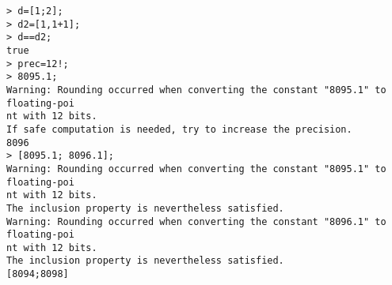 \begin{center}\begin{minipage}{15cm}\begin{Verbatim}[frame=single]
> d=[1;2];
> d2=[1,1+1];
> d==d2;
true
> prec=12!;
> 8095.1;
Warning: Rounding occurred when converting the constant "8095.1" to floating-poi
nt with 12 bits.
If safe computation is needed, try to increase the precision.
8096
> [8095.1; 8096.1];
Warning: Rounding occurred when converting the constant "8095.1" to floating-poi
nt with 12 bits.
The inclusion property is nevertheless satisfied.
Warning: Rounding occurred when converting the constant "8096.1" to floating-poi
nt with 12 bits.
The inclusion property is nevertheless satisfied.
[8094;8098]
\end{Verbatim}
\end{minipage}\end{center}
